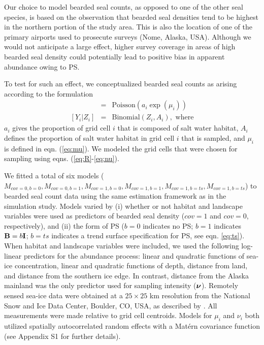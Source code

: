 \documentclass[times,mee,doublespace,]{besauth2}
\begin{document}
Our choice to model bearded seal counts, as opposed to one of the other seal species, is based on the observation that bearded seal densities tend to be highest in the northern portion of the study area. This is also the location of one of the primary airports used to prosecute surveys (Nome, Alaska, USA).  Although we would not anticipate a large effect, higher survey coverage in areas of high bearded seal density could potentially lead to positive bias in apparent abundance owing to PS.

To test for such an effect, we conceptualized bearded seal counts as arising according to the formulation
\begin{eqnarray*}
  [Z_i | \mu_i] & = & \textrm{Poisson}(a_i \exp(\mu_i)) \\
{}  [Y_i|Z_i] & = & \textrm{Binomial}(Z_i, A_i), \text{ where}
\end{eqnarray*}
$a_i$ gives the proportion of grid cell $i$ that is composed of salt water habitat, $A_i$ defines the proportion of salt water habitat in grid cell $i$ that is sampled, and $\mu_i$ is defined in eqn. (\ref{eq:mu}).
We modeled the grid cells that were chosen for sampling using eqns. (\ref{eq:R}-\ref{eq:nu}).

We fitted a total of six models ($M_{cov=0,b=0},M_{cov=0,b=1},M_{cov=1,b=0},M_{cov=1,b=1},M_{cov=1,b=ts},M_{cov=1,b=ts}$) to bearded seal count data using the same estimation framework as in the simulation study.  Models varied by (i) whether or not habitat and landscape variables were used as predictors of bearded seal density ($cov=1$ and $cov=0$, respectively), and (ii) the form of PS ($b=0$ indicates no PS; $b=1$ indicates ${\bf B}=b{\bf I}$; $b=ts$ indicates a trend surface specification for PS, see eqn. \ref{eq:ts}).  When habitat and landscape variables were included, we used the following log-linear predictors for the abundance process: linear and quadratic functions of sea-ice concentration, linear and quadratic functions of depth, distance from land, and distance from the southern ice edge. In contrast, distance from the Alaska mainland was the only predictor used for sampling intensity ($\boldsymbol{\nu}$). Remotely sensed sea-ice data were obtained at a $25 \times 25$ km resolution from the National Snow and Ice Data Center, Boulder, CO, USA, as described by \citet{ConnEtAl2014}. All measurements were made relative to grid cell centroids.  Models for $\mu_i$ and $\nu_i$ both utilized spatially autocorrelated random effects with a Mat\'{e}rn covariance function (see Appendix S1 for further details).
\end{document}
